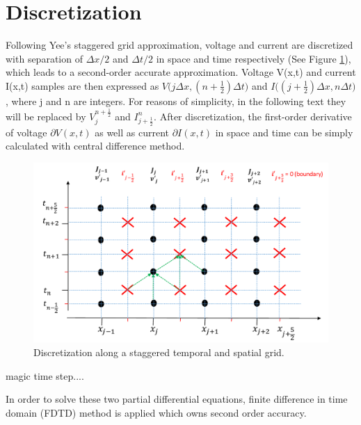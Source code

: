 \documentclass[11pt,final]{scrbook}
\begin{document}
\section{Discretization}
Following Yee’s staggered grid approximation\cite{yee1966numerical}, voltage and current are discretized with separation of $\Delta x/2$ and $\Delta t/2$ in space and time respectively (See Figure \ref{fig:Discretisation}), which leads to a second-order accurate approximation. Voltage V(x,t) and current I(x,t) samples are then expressed as $ V\big(j\Delta x, (n+\frac{1}{2})\Delta t\big)$ and $ I\big((j+\frac{1}{2})\Delta x, n\Delta t\big)$, where j and n are integers. For reasons of simplicity, in the following text they will be replaced by $ V _{ j }^{ n+\frac{1}{2}}$ and ${ I }_{ j+\frac{1}{2} }^{ n }$. After discretization, the first-order derivative of voltage $\partial V(x,t)$ as well as current $\partial I(x,t)$ in space and time can be simply calculated with central difference method\cite{yang2012central}. 
\begin{figure}[htbp]
\begin{center}
\includegraphics[scale=0.6]{images/Discretization}
\caption{Discretization along a staggered temporal and spatial grid.}
\label{fig:Discretisation}
\end{center}
\end{figure}

magic time step....

In order to solve these two partial differential equations, finite difference in time domain (FDTD) method is applied which owns second order accuracy.
\end{document}
